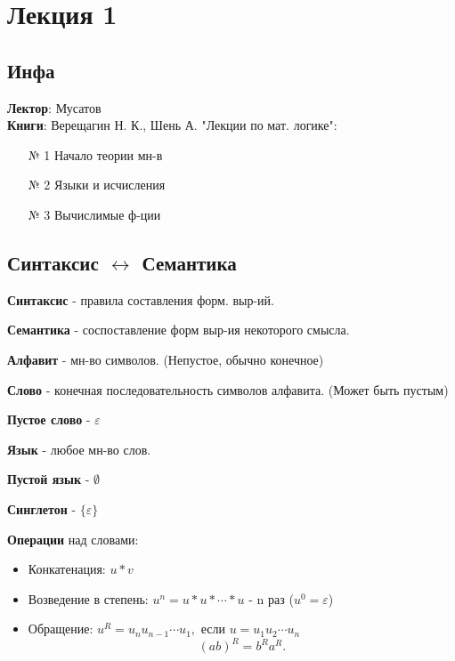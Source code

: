 \section{Лекция 1}

\subsection{Инфа}
\textbf{Лектор}: Мусатов \\
\textbf{Книги}: Верещагин Н. К., Шень А. "Лекции по мат. логике":
\begin{enumerate}
    \item [№ 1] Начало теории мн-в
    \item [№ 2] Языки и исчисления
    \item [№ 3] Вычислимые ф-ции
\end{enumerate}

\subsection{Синтаксис $\leftrightarrow$ Семантика}
\begin{definition}
\textbf{Синтаксис} - правила составления форм. выр-ий.
\end{definition}
\begin{definition}
\textbf{Семантика} - соспоставление форм выр-ия некоторого смысла.
\end{definition}
\begin{definition}
\textbf{Алфавит} - мн-во символов. (Непустое, обычно конечное)
\end{definition}
\begin{definition}
\textbf{Слово} - конечная последовательность символов алфавита. (Может быть пустым)

\textbf{Пустое слово} -  $\varepsilon$
\end{definition}
\begin{definition}
\textbf{Язык} - любое мн-во слов.

\textbf{Пустой язык} - $\emptyset$
 
\textbf{Синглетон} - $\{\varepsilon\}$
\end{definition}

\textbf{Операции} над словами:
\begin{itemize}
    \item Конкатенация: $u * v$
    \item Возведение в степень:  $u^{n} = u * u * \cdots * u$ - n раз ($u^{0} = \varepsilon$)
    \item Обращение: $u^{R} = u_n u_{n - 1} \cdots  u_1, \text{ если } u = u_1 u_2 \cdots u_n$
        \[
            (ab)^{R} = b^{R}a^{R}
        .\] 
\end{itemize}

